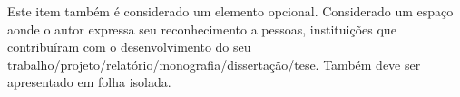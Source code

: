 \begin{agradecimentos}[AGRADECIMENTOS]
Este item também é considerado um elemento opcional. Considerado um espaço aonde
o autor expressa seu reconhecimento a pessoas, instituições que contribuíram com o
desenvolvimento do seu trabalho/projeto/relatório/monografia/dissertação/tese. Também deve
ser apresentado em folha isolada.

\end{agradecimentos}
